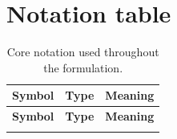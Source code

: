 \documentclass[11pt]{article}
\begin{document}
\section{Notation table}

\renewcommand{\arraystretch}{1.16}

\begin{longtable}{p{}p{}p{}}
\caption{Core notation used throughout the formulation.}
\label{tab:notation}\\
\toprule
\textbf{Symbol} & \textbf{Type} & \textbf{Meaning} \\
\midrule
\endfirsthead

\toprule
\textbf{Symbol} & \textbf{Type} & \textbf{Meaning} \\
\midrule
\endhead

\bottomrule
\endfoot


\end{longtable}
\end{document}
